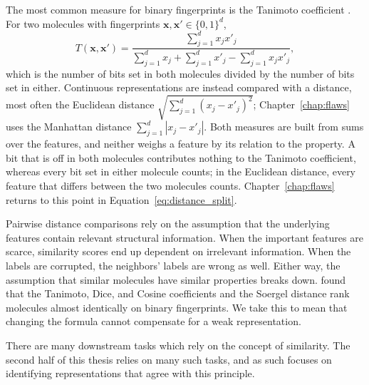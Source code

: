 The most common measure for binary fingerprints is the Tanimoto coefficient \citep{Bajusz2015}. For two molecules with fingerprints $\mathbf{x}, \mathbf{x}' \in \{0,1\}^d$,
\begin{equation}
T(\mathbf{x}, \mathbf{x}') = \frac{\sum_{j=1}^{d} x_j x'_j}{\sum_{j=1}^{d} x_j + \sum_{j=1}^{d} x'_j - \sum_{j=1}^{d} x_j x'_j},
\label{eq:tanimoto}
\end{equation}
which is the number of bits set in both molecules divided by the number of bits set in either. Continuous representations are instead compared with a distance, most often the Euclidean distance $\sqrt{\sum_{j=1}^{d}(x_j - x'_j)^2}$; Chapter~\ref{chap:flaws} uses the Manhattan distance $\sum_{j=1}^{d}|x_j - x'_j|$. Both measures are built from sums over the features, and neither weighs a feature by its relation to the property. A bit that is off in both molecules contributes nothing to the Tanimoto coefficient, whereas every bit set in either molecule counts; in the Euclidean distance, every feature that differs between the two molecules counts. Chapter~\ref{chap:flaws} returns to this point in Equation~\ref{eq:distance_split}.


Pairwise distance comparisons rely on the assumption that the underlying features contain relevant structural information. When the important features are scarce, similarity scores end up dependent on irrelevant information. When the labels are corrupted, the neighbors' labels are wrong as well. Either way, the assumption that similar molecules have similar properties breaks down. \citet{Bajusz2015} found that the Tanimoto, Dice, and Cosine coefficients and the Soergel distance rank molecules almost identically on binary fingerprints. We take this to mean that changing the formula cannot compensate for a weak representation.

There are many downstream tasks which rely on the concept of similarity. The second half of this thesis relies on many such tasks, and as such focuses on identifying representations that agree with this principle. 

